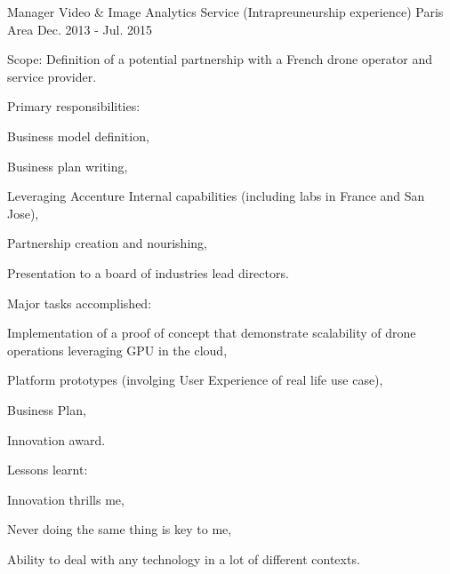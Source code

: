 

\begin{cventries}

  \cventry
    {Manager} %
    {Video \& Image Analytics Service (Intrapreuneurship experience)} %
    {Paris Area} %
    {Dec. 2013 - Jul. 2015} %
    {
      \begin{cvitems} %
        \item {Scope: Definition of a potential partnership with a French drone operator and service provider.}
        \item {Primary responsibilities:}
        \begin{cvsubitems}
          \item {Business model definition,}
          \item {Business plan writing,}
          \item {Leveraging Accenture Internal capabilities (including labs in France and San Jose),}
          \item {Partnership creation and nourishing,}
          \item {Presentation to a board of industries lead directors.}
        \end{cvsubitems}
        \item {Major tasks accomplished:}
        \begin{cvsubitems}
          \item {Implementation of a proof of concept that demonstrate scalability of drone operations leveraging GPU in the cloud,}
          \item {Platform prototypes (involging User Experience of real life use case),}
          \item {Business Plan,}
          \item {Innovation award.}
        \end{cvsubitems}
        \item {Lessons learnt:}
        \begin{cvsubitems}
          \item {Innovation thrills me,}
          \item {Never doing the same thing is key to me,}
          \item {Ability to deal with any technology in a lot of different contexts.}
        \end{cvsubitems}
      \end{cvitems}
    }


\end{cventries}
